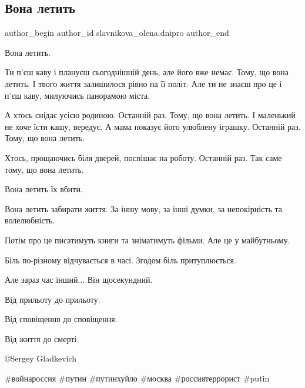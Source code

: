  
 
 
 
 

\subsection{Вона летить}
\label{sec:15_01_2023.fb.slavnikova_olena.dnipro.1.vona_letit}

\ifcmt
 author_begin
   author_id slavnikova_olena.dnipro
 author_end
\fi

Вона летить.

Ти п'єш каву і плануєш сьогоднішній день, але його вже немає. Тому, що вона
летить. І твого життя залишилося рівно на її політ. Але ти не знаєш про це і
п'єш каву, милуючись панорамою міста.

А хтось снідає усією родиною. Останній раз. Тому, що вона летить. І маленький
не хоче їсти кашу, вередує. А мама показує його улюблену іграшку. Останній раз.
Тому, що вона летить.

Хтось, прощаючись біля дверей, поспішає на роботу. Останній раз. Так саме тому,
що вона летить.

Вона летить їх вбити.

Вона летить забирати життя. За іншу мову, за інші думки, за непокірність та
волелюбність.

Потім про це писатимуть книги та зніматимуть фільми. Але це у майбутньому. 

Біль по-різному відчувається в часі. Згодом біль притуплюється. 

Але зараз час інший... Він щосекундний. 

Від прильоту до прильоту. 

Від сповіщення до сповіщення. 

Від життя до смерті.

©Sergey Gladkevich

\#войнароссия \#путин \#путинхуйло \#москва \#россиятеррорист \#putin
